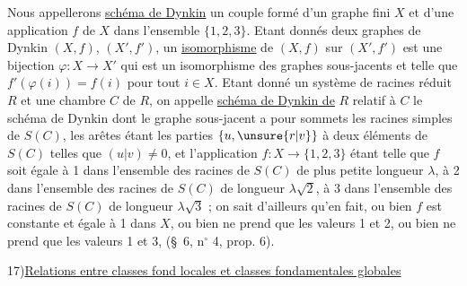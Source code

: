 Nous appellerons \uline{schéma de Dynkin} un couple formé d'un graphe fini $X$
et d'une application $f$ de $X$ dans l'ensemble $\{1,2,3\}$.
Etant donnés deux graphes de Dynkin $(X,f)$, $(X',f')$, un \uline{isomorphisme}
de $(X,f)$ sur $(X',f')$ est une bijection $\varphi:X\longrightarrow X'$
qui est un isomorphisme des graphes sous-jacents et telle que
$f'(\varphi(i))=f(i)$ pour tout $i\in X$.
Etant donné un système de racines réduit $R$ et une chambre $C$ de $R$,
on appelle \uline{schéma de Dynkin de} $R$ relatif à $C$ le schéma de Dynkin dont
le graphe sous-jacent a pour sommets les racines simples de $S(C)$,
les arêtes étant les parties $\{u,\unsure{r|v}\}$ à deux éléments de $S(C)$
telles que $(u|v)\neq0$, et l'application $f:X\longrightarrow\{1,2,3\}$
étant telle que $f$ soit égale à 1 dans l'ensemble des racines de $S(C)$
de plus petite longueur $\lambda$, à 2 dans l'ensemble des racines de $S(C)$
de longueur $\lambda\sqrt2$, à 3 dans l'ensemble des racines de $S(C)$
de longueur $\lambda\sqrt3$ ; on sait d'ailleurs qu'en fait, ou bien $f$ est
constante et égale à 1 dans $X$, ou bien ne prend que les valeurs 1 et 2,
ou bien ne prend que les valeurs 1 et 3, (\S\ 6, n$^\circ$ 4, prop. 6).

17)\quad\uline{Relations entre classes fond locales et classes fondamentales globales}



